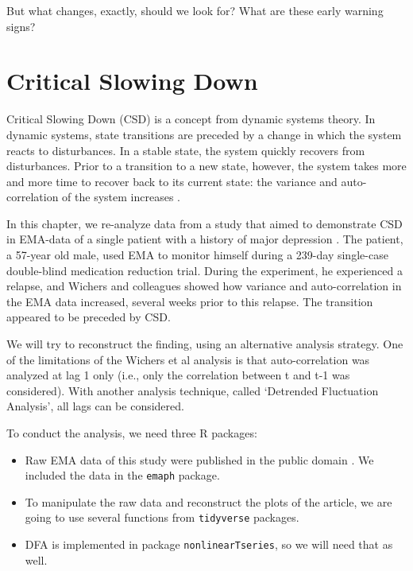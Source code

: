 \documentclass[]{book}
\begin{document}
But what changes, exactly, should we look for? What are these early
warning signs?

\section{Critical Slowing Down}\label{critical-slowing-down}

Critical Slowing Down (CSD) is a concept from dynamic systems theory. In
dynamic systems, state transitions are preceded by a change in which the
system reacts to disturbances. In a stable state, the system quickly
recovers from disturbances. Prior to a transition to a new state,
however, the system takes more and more time to recover back to its
current state: the variance and auto-correlation of the system increases
\citep{Scheffer2009, Dakos2008}.

In this chapter, we re-analyze data from a study that aimed to
demonstrate CSD in EMA-data of a single patient with a history of major
depression \citetext{\citealp[
\citet{Kossakowski2017}]{Groot2010}; \citealp{Wichers2016}}. The
patient, a 57-year old male, used EMA to monitor himself during a
239-day single-case double-blind medication reduction trial. During the
experiment, he experienced a relapse, and Wichers and colleagues showed
how variance and auto-correlation in the EMA data increased, several
weeks prior to this relapse. The transition appeared to be preceded by
CSD.

We will try to reconstruct the finding, using an alternative analysis
strategy. One of the limitations of the Wichers et al analysis is that
auto-correlation was analyzed at lag 1 only (i.e., only the correlation
between t and t-1 was considered). With another analysis technique,
called `Detrended Fluctuation Analysis', all lags can be considered.

To conduct the analysis, we need three R packages:

\begin{itemize}
\item
  Raw EMA data of this study were published in the public domain
  \citep{Kossakowski2017}. We included the data in the \texttt{emaph}
  package.
\item
  To manipulate the raw data and reconstruct the plots of the article,
  we are going to use several functions from \texttt{tidyverse}
  packages.
\item
  DFA is implemented in package \texttt{nonlinearTseries}, so we will
  need that as well.
\end{itemize}
\end{document}
